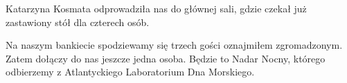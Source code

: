 Katarzyna Kosmata odprowadziła nas do głównej sali, gdzie czekał już zastawiony stół dla czterech osób.

\ds{} Na naszym bankiecie spodziewamy się trzech gości \dm{} oznajmiłem zgromadzonym. \dm{} Zatem dołączy do nas jeszcze jedna osoba.
Będzie to Nadar Nocny, którego odbierzemy z Atlantyckiego Laboratorium Dna Morskiego.\de{}

















